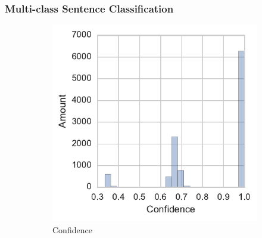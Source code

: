 


\subsubsection{Multi-class Sentence Classification}
\label{subs:Multi-class Sentence Classification}





\begin{figure}[h]
    \centering
    \begin{subfigure}[b]{0.46\textwidth}
        \includegraphics[width=\textwidth]{img/sentence-data-judgement-confidence.pdf}
        \caption{Confidence}
\label{fig:sentence-data-judgement-confidence}
    \end{subfigure}
~%
    \begin{subfigure}[b]{0.43\textwidth}

\end{subfigure}
\end{figure}
